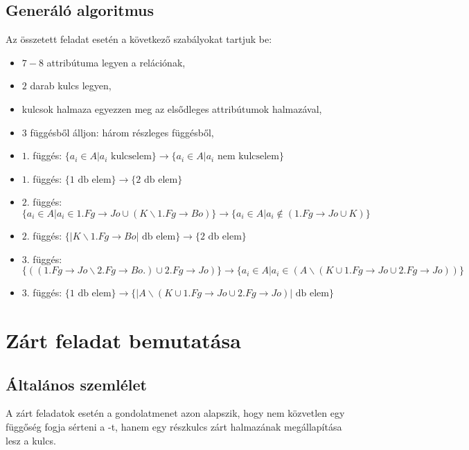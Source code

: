 \subsection{Generáló algoritmus}
Az összetett feladat esetén a következő szabályokat tartjuk be:
\begin{itemize}
    \item $7-8$ attribútuma legyen a relációnak,
    \item $2$ darab kulcs legyen,
    \item kulcsok halmaza egyezzen meg az elsődleges attribútumok halmazával,
    \item $3$ függésből álljon: három részleges függésből,
    \item $1.$ függés: $\big\{ a_i \in A \big| a_i \text{ kulcselem}  \big\} \longrightarrow \big\{  a_i \in A \big| a_i \text{ nem kulcselem}  \big\}$ 
    \item $1.$ függés: $\big \{ 1 \text{ db elem} \big\} \longrightarrow \big\{ 2 \text{ db elem} \big \}$
    \item $2.$ függés: $\big\{ a_i \in A \big| a_i \in 1.Fg \rightarrow Jo \cup (K \backslash 1.Fg \rightarrow Bo )  \big\} \longrightarrow \big\{  a_i \in A \big| a_i \not \in (1.Fg \rightarrow Jo \cup K)  \big\}$ 
    \item $2.$ függés: $\big \{ |K \backslash 1.Fg \rightarrow Bo| \text{ db elem} \big\} \longrightarrow \big\{ 2 \text{ db elem} \big \}$
    \item $3.$ függés: $\big\{ ((1.Fg \rightarrow Jo \backslash 2.Fg \rightarrow Bo.) \cup  2.Fg \rightarrow Jo) \big\} \longrightarrow \big\{  a_i \in A  \big| a_i \in (A \backslash (K \cup 1.Fg \rightarrow Jo \cup 2. Fg \rightarrow Jo)) \big\}$
    \item $3.$ függés: $\big \{ 1 \text{ db elem} \big\} \longrightarrow \big\{|A \backslash (K \cup 1.Fg \rightarrow Jo \cup 2. Fg \rightarrow Jo)| \text{ db elem} \big \}$
\end{itemize}

\section{Zárt feladat bemutatása}

\subsection{Általános szemlélet}

A zárt feladatok esetén a gondolatmenet azon alapszik, hogy nem közvetlen egy függőség fogja sérteni a \nfk-t, hanem egy részkulcs zárt halmazának megállapítása lesz a kulcs. 

